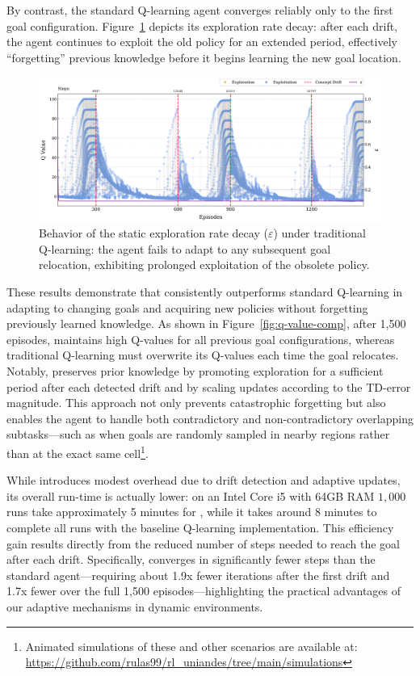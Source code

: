 By contrast, the standard Q-learning agent converges reliably only to the first goal configuration. Figure~\ref{fig:static-eps} depicts its exploration rate decay: after each drift, the agent continues to exploit the old policy for an extended period, effectively “forgetting” previous knowledge before it begins learning the new goal location.

\begin{figure}
    \centering
    \includegraphics[width=\textwidth]{figures/trad_eps.png}
    \caption{Behavior of the static exploration rate decay ($\varepsilon$) under traditional Q-learning: the agent fails to adapt to any subsequent goal relocation, exhibiting prolonged exploitation of the obsolete policy.}
    \label{fig:static-eps}
\end{figure}


These results demonstrate that \adaptiverl consistently outperforms standard Q-learning in adapting to changing goals and acquiring new policies without forgetting previously learned knowledge. As shown in Figure~\ref{fig:q-value-comp}, after 1,500 episodes, \adaptiverl maintains high Q-values for all previous goal configurations, whereas traditional Q-learning must overwrite its Q-values each time the goal relocates. Notably, \adaptiverl preserves prior knowledge by promoting exploration for a sufficient period after each detected drift and by scaling updates according to the TD-error magnitude. This approach not only prevents catastrophic forgetting but also enables the agent to handle both contradictory and non-contradictory overlapping subtasks---such as when goals are randomly sampled in nearby regions rather than at the exact same cell\footnote{Animated simulations of these and other scenarios are available at: \url{https://github.com/rulas99/rl_uniandes/tree/main/simulations}}.

While \adaptiverl introduces modest overhead due to drift detection and adaptive updates, its overall 
run-time is actually lower: on an Intel Core i5 with 64GB RAM $1,000$ runs take approximately 5
minutes for \adaptiverl, while it takes around 8 minutes to complete all runs with the baseline Q-learning implementation. This efficiency gain results directly from the reduced number of steps needed to reach the goal after each drift. Specifically, \adaptiverl converges in significantly fewer steps than the standard agent---requiring about 1.9x fewer iterations after the first drift and 1.7x fewer over the full 1,500 episodes---highlighting the practical advantages of our adaptive mechanisms in dynamic environments.

